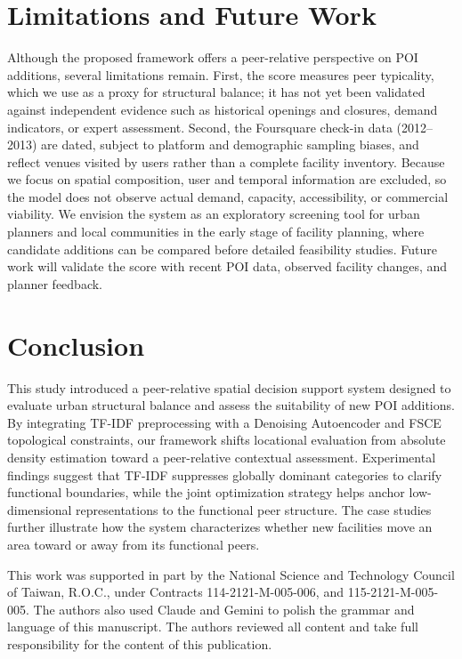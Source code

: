 \documentclass[sigconf]{acmart}
\begin{document}
\section{Limitations and Future Work}
Although the proposed framework offers a peer-relative perspective on POI additions, several limitations remain. First, the score measures peer typicality, which we use as a proxy for structural balance; it has not yet been validated against independent evidence such as historical openings and closures, demand indicators, or expert assessment. Second, the Foursquare check-in data (2012--2013) are dated, subject to platform and demographic sampling biases, and reflect venues visited by users rather than a complete facility inventory. Because we focus on spatial composition, user and temporal information are excluded, so the model does not observe actual demand, capacity, accessibility, or commercial viability. We envision the system as an exploratory screening tool for urban planners and local communities in the early stage of facility planning, where candidate additions can be compared before detailed feasibility studies. Future work will validate the score with recent POI data, observed facility changes, and planner feedback.

\section{Conclusion}

This study introduced a peer-relative spatial decision support system designed to evaluate urban structural balance and assess the suitability of new POI additions. By integrating TF-IDF preprocessing with a Denoising Autoencoder and FSCE topological constraints, our framework shifts locational evaluation from absolute density estimation toward a peer-relative contextual assessment. Experimental findings suggest that TF-IDF suppresses globally dominant categories to clarify functional boundaries, while the joint optimization strategy helps anchor low-dimensional representations to the functional peer structure. The case studies further illustrate how the system characterizes whether new facilities move an area toward or away from its functional peers.

\begin{acks}
This work was supported in part by the National Science and Technology Council of Taiwan, R.O.C., under Contracts 114-2121-M-005-006, and 115-2121-M-005-005. The authors also used Claude and Gemini to polish the grammar and language of this manuscript. The authors reviewed all content and take full responsibility for the content of this publication.
\end{acks}
%


\end{document}
